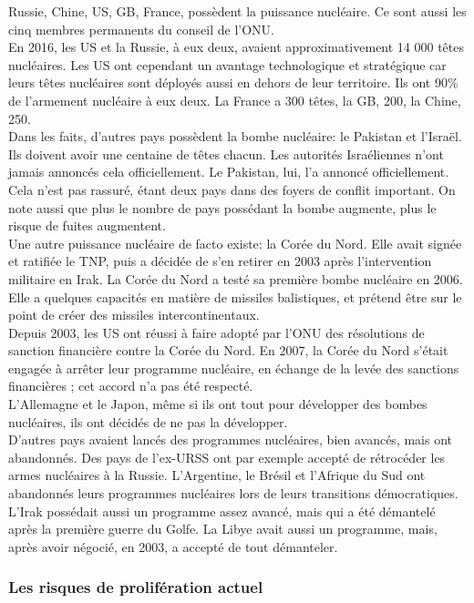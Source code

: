 \documentclass[10pt, a4paper, openany]{book}
\begin{document}
Russie, Chine, US, GB, France, possèdent la puissance nucléaire. Ce sont aussi les cinq membres permanents du conseil de l'ONU. \\
En 2016, les US et la Russie, à eux deux, avaient approximativement 14 000 têtes nucléaires. Les US ont cependant un avantage technologique et stratégique car leurs têtes nucléaires sont déployés aussi en dehors de leur territoire. Ils ont 90\% de l'armement nucléaire à eux deux. La France a 300 têtes, la GB, 200, la Chine, 250. \\
Dans les faits, d'autres pays possèdent la bombe nucléaire: le Pakistan et l'Israël. Ils doivent avoir une centaine de têtes chacun. Les autorités Israéliennes n'ont jamais annoncés cela officiellement. Le Pakistan, lui, l'a annoncé officiellement. Cela n'est pas rassuré, étant deux pays dans des foyers de conflit important. On note aussi que plus le nombre de pays possédant la bombe augmente, plus le risque de fuites augmentent. \\
Une autre puissance nucléaire de facto existe: la Corée du Nord. Elle avait signée et ratifiée le TNP, puis a décidée de s'en retirer en 2003 après l'intervention militaire en Irak. La Corée du Nord a testé sa première bombe nucléaire en 2006. Elle a quelques capacités en matière de missiles balistiques, et prétend être sur le point de créer des missiles intercontinentaux. \\
Depuis 2003, les US ont réussi à faire adopté par l'ONU des résolutions de sanction financière contre la Corée du Nord. En 2007, la Corée du Nord s'était engagée à arrêter leur programme nucléaire, en échange de la levée des sanctions financières ; cet accord n'a pas été respecté. \\
L'Allemagne et le Japon, même si ils ont tout pour développer des bombes nucléaires, ils ont décidés de ne pas la développer. \\
D'autres pays avaient lancés des programmes nucléaires, bien avancés, mais ont abandonnés. Des pays de l'ex-URSS ont par exemple accepté de rétrocéder les armes nucléaires à la Russie. L'Argentine, le Brésil et l'Afrique du Sud ont abandonnés leurs programmes nucléaires lors de leurs transitions démocratiques. L'Irak possédait aussi un programme assez avancé, mais qui a été démantelé après la première guerre du Golfe. La Libye avait aussi un programme, mais, après avoir négocié, en 2003, a accepté de tout démanteler.

\subsubsection{Les risques de prolifération actuel}
\end{document}
